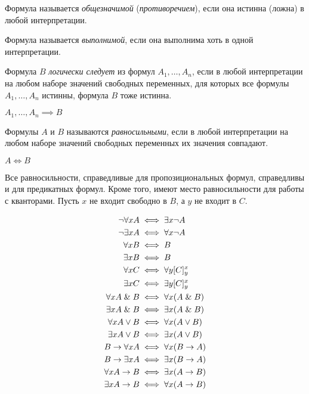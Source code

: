 \begin{definition}
	Формула называется \emph{общезначимой} (\emph{противоречием}), если она истинна (ложна) в любой интерпретации.
\end{definition}

\begin{definition}
	Формула называется \emph{выполнимой}, если она выполнима хоть в одной интерпретации.
\end{definition}

\begin{definition}
	Формула $ B $ \emph{логически следует} из формул $ A_1, \dots, A_n $, если в любой интерпретации на любом наборе значений свободных переменных, для которых все формулы $ A_1, \dots, A_n $ истинны, формула $ B $ тоже истинна.
\end{definition}

\begin{notation}
	$ A_1, \dots, A_n \implies B $
\end{notation}

\begin{definition}
	Формулы $ A $ и $ B $ называются \emph{равносильными}, если в любой интерпретации на любом наборе значений свободных переменных их значения совпадают.
\end{definition}

\begin{notation}
	$ A \iff B $
\end{notation}

Все равносильности, справедливые для пропозициональных формул, справедливы и для предикатных формул. Кроме того, имеют место равносильности для работы с кванторами. Пусть $ x $ не входит свободно в $ B $, а $ y $ не входит в $ C $.

\begin{align*}
	\neg \forall x A &\iff \exists x \neg A \\
	\neg \exists x A &\iff \forall x \neg A \\
	\forall x B &\iff B \\
	\exists x B &\iff B \\
	\forall x C &\iff \forall y [C]_y^x \\
	\exists x C &\iff \exists y [C]_y^x \\
	\forall x A \mathrel\& B &\iff \forall x (A \mathrel\& B) \\
	\exists x A \mathrel\& B &\iff \exists x (A \mathrel\& B) \\
	\forall x A \vee B &\iff \forall x (A \vee B) \\
	\exists x A \vee B &\iff \exists x (A \vee B) \\
	B \to \forall x A &\iff \forall x(B \to A) \\
	B \to \exists x A &\iff \exists x (B \to A) \\
	\forall x A \to B &\iff \exists x (A \to B) \\
	\exists x A \to B &\iff \forall x (A \to B)
\end{align*}

